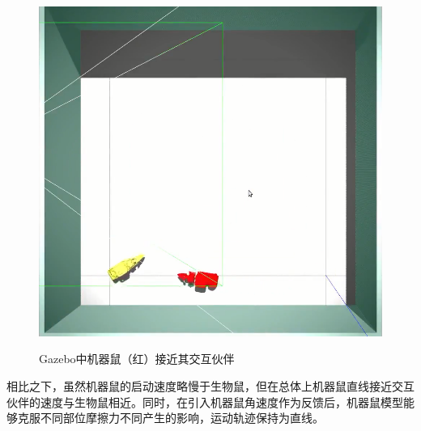 \begin{figure}[htbp]
{  \includegraphics[width=0.27\linewidth]{images/ch03/check/walk/t004.png}
  }
  \caption{Gazebo中机器鼠（红）接近其交互伙伴}\label{figure_simappr}
\end{figure}
相比之下，虽然机器鼠的启动速度略慢于生物鼠，但在总体上机器鼠直线接近交互伙伴的速度与生物鼠相近。同时，在引入机器鼠角速度作为反馈后，机器鼠模型能够克服不同部位摩擦力不同产生的影响，运动轨迹保持为直线。

